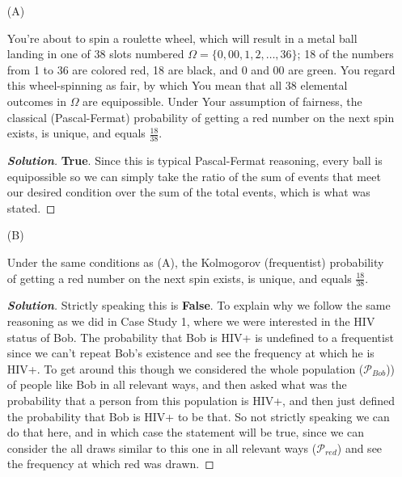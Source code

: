 \documentclass[12pt]{article}
\newenvironment{solution}{\begin{proof}[\textbf{\textit{Solution}}] }{\end{proof}}
\begin{document}
\begin{itemize}

\item[(A)]

You're about to spin a roulette wheel, which will result in a metal ball landing in one of 38 slots numbered $\Omega = \{ 0, 00, 1, 2, \dots, 36\}$; 18 of the numbers from 1 to 36 are colored red, 18 are black, and 0 and 00 are green. You regard this wheel-spinning as fair, by which You mean that all 38 elemental outcomes in $\Omega$ are equipossible. Under Your assumption of fairness, the classical (Pascal-Fermat) probability of getting a red number on the next spin exists, is unique, and equals $\frac{18 }{ 38 }$.
\begin{tcolorbox}[breakable]
    \begin{solution}
        \textbf{True}. Since this is typical Pascal-Fermat reasoning, every ball is equipossible so we can simply take the ratio of the sum of events that meet our desired condition over the sum of the total events, which is what was stated. 
    \end{solution}
\end{tcolorbox}

\newpage
\item[(B)]

Under the same conditions as (A), the Kolmogorov (frequentist) probability of getting a red number on the next spin exists, is unique, and equals
$\frac{ 18 }{ 38 }$.
\begin{tcolorbox}[breakable]
    \begin{solution}
        Strictly speaking this is \textbf{False}. To explain why we follow the same reasoning as we did in Case Study 1, where we were interested in the HIV status of Bob. The probability that Bob is HIV+ is undefined to a frequentist since we can't repeat Bob's existence and see the frequency at which he is HIV+. To get around this though we considered the whole population ($\mathcal{P}_{Bob}$)) of people like Bob in all relevant ways, and then asked what was the probability that a person from this population is HIV+, and then just defined the probability that Bob is HIV+ to be that. So not strictly speaking we can do that here, and in which case the statement will be true, since we can consider the all draws similar to this one in all relevant ways ($\mathcal{P}_{red}$) and see the frequency at which red was drawn. 
    \end{solution}
\end{tcolorbox}



\end{itemize}
\end{document}
